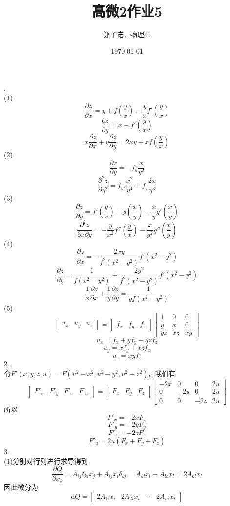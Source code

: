 \documentclass[utf8]{ctexart}
\title{高微2作业5}
\author{郑子诺，物理41}
\date{\today}
\begin{document}
\maketitle
{}.\\
(1)
\[\frac{\partial z}{\partial x}=y+f\left(\frac{y}{x}\right)-\frac{y}{x}f'\left(\frac{y}{x}\right)\]
\[\frac{\partial z}{\partial y}=x+f'\left(\frac{y}{x}\right)\]
\[x\frac{\partial z}{\partial x}+y\frac{\partial z}{\partial y}=2xy+xf\left(\frac{y}{x}\right)\]
(2)
\[\frac{\partial z}{\partial y}=-f_y\frac{x}{y^2}\]
\[\frac{\partial^2z}{\partial y^2}=f_{yy}\frac{x^2}{y^4}+f_y\frac{2x}{y^3}\]
(3)
\[\frac{\partial z}{\partial y}=f'\left(\frac{y}{x}\right)+g\left(\frac{x}{y}\right)-\frac{x}{y}g'\left(\frac{x}{y}\right)\]
\[\frac{\partial^2z}{\partial x\partial y}=-\frac{y}{x^2}f''\left(\frac{y}{x}\right)-\frac{x}{y^2}g''\left(\frac{x}{y}\right)\]
(4)
\[\frac{\partial z}{\partial x}=-\frac{2xy}{f^2(x^2-y^2)}f'(x^2-y^2)\]
\[\frac{\partial z}{\partial y}=\frac{1}{f(x^2-y^2)}+\frac{2y^2}{f^2(x^2-y^2)}f'(x^2-y^2)\]
\[\frac{1}{x}\frac{\partial z}{\partial x}+\frac{1}{y}\frac{\partial z}{\partial y}=\frac{1}{yf(x^2-y^2)}\]
(5)
\[\begin{bmatrix}
	u_x&u_y&u_z
\end{bmatrix}=\begin{bmatrix}
f_x&f_y&f_z
\end{bmatrix}\begin{bmatrix}
1&0&0\\
y&x&0\\
yz&xz&xy
\end{bmatrix}\]
\[u_x=f_x+yf_y+yzf_z\]
\[u_y=xf_y+xzf_z\]
\[u_z=xyf_z\]
2.\\
令$F'(x,y,z,u)=F(u^2-x^2,u^2-y^2,u^2-z^2)$，我们有
\[\begin{bmatrix}
	F'_x&F'_y&F'_z&F'_u
\end{bmatrix}=\begin{bmatrix}
F_x&F_y&F_z
\end{bmatrix}\begin{bmatrix}
-2x&0&0&2u\\
0&-2y&0&2u\\
0&0&-2z&2u
\end{bmatrix}\]
所以
\[F'_x=-2xF_x\]
\[F'_y=-2yF_y\]
\[F'_z=-2zF_z\]
\[F'_u=2u(F_x+F_y+F_z)\]
3.\\
(1)分别对行列进行求导得到
\[\frac{\partial Q}{\partial x_k}=A_{ij}\delta_{ki}x_j+A_{ij}x_i\delta_{kj}=A_{kl}x_l+A_{lk}x_l=2A_{kl}x_l\]
因此微分为
\[\mathrm{d}Q=\begin{bmatrix}
	2A_{1i}x_i&2A_{2i}x_i&\cdots&2A_{ni}x_i
\end{bmatrix}\]
\end{document}
